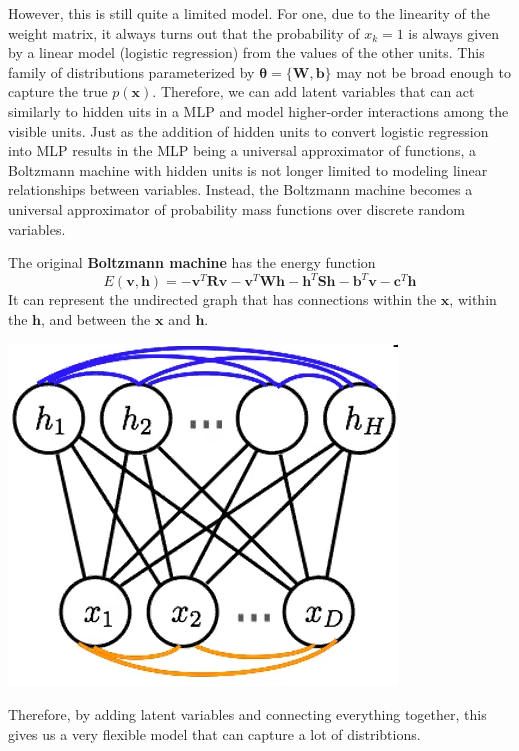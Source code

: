 \documentclass{article}
\begin{document}
    However, this is still quite a limited model. For one, due to the linearity of the weight matrix, it always turns out that the probability of $x_k = 1$ is always given by a linear model (logistic regression) from the values of the other units. This family of distributions parameterized by $\boldsymbol{\theta} = \{\mathbf{W}, \mathbf{b}\}$ may not be broad enough to capture the true $p(\mathbf{x})$. Therefore, we can add latent variables that can act similarly to hidden uits in a MLP and model higher-order interactions among the visible units. Just as the addition of hidden units to convert logistic regression into MLP results in the MLP being a universal approximator of functions, a Boltzmann machine with hidden units is not longer limited to modeling linear relationships between variables. Instead, the Boltzmann machine becomes a universal approximator of probability mass functions over discrete random variables. 

    \begin{definition}
      The original \textbf{Boltzmann machine} has the energy function 
        \[E(\mathbf{v}, \mathbf{h}) = - \mathbf{v}^T \mathbf{R} \mathbf{v} - \mathbf{v}^T \mathbf{W} \mathbf{h} - \mathbf{h}^T \mathbf{S} \mathbf{h} - \mathbf{b}^T \mathbf{v} - \mathbf{c}^T \mathbf{h} \]
      It can represent the undirected graph that has connections within the $\mathbf{x}$, within the $\mathbf{h}$, and between the $\mathbf{x}$ and $\mathbf{h}$.
      \begin{center} 
        \includegraphics[scale=0.4]{img/07_Boltzmann/boltzmann_lateral.png}
      \end{center}
      Therefore, by adding latent variables and connecting everything together, this gives us a very flexible model that can capture a lot of distribtions.
    \end{definition} 
\end{document}
